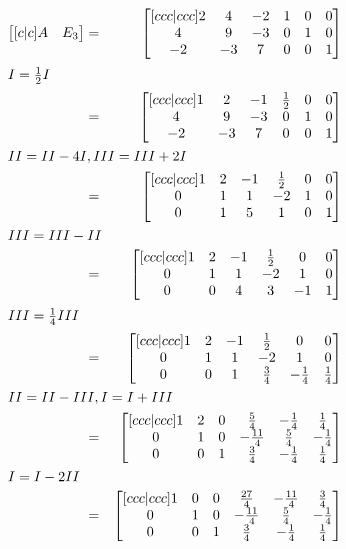 \documentclass[10pt,a4paper,oneside,ngerman,numbers=noenddot]{scrartcl}
\begin{document}
\subsection{} %
\begin{alignat*}{2}
\begin{bmatrix}[c|c]
A & E_{3}
\end{bmatrix} &=& 
\begin{bmatrix}[ccc|ccc]
2 & 4 & -2 & 1 & 0 & 0 \\
4 & 9 & -3 & 0 & 1 & 0 \\
-2 & -3 & 7 & 0 & 0 & 1
\end{bmatrix} \\
\intertext{$I = \frac{1}{2}I$}
&=&
\begin{bmatrix}[ccc|ccc]
1 & 2 & -1 & \frac{1}{2} & 0 & 0 \\
4 & 9 & -3 & 0 & 1 & 0 \\
-2 & -3 & 7 & 0 & 0 & 1
\end{bmatrix} \\
\intertext{$II = II - 4I, III = III + 2I$}
&=&
\begin{bmatrix}[ccc|ccc]
1 & 2 & -1 & \frac{1}{2} & 0 & 0 \\
0 & 1 & 1 & -2 & 1 & 0 \\
0 & 1 & 5 & 1 & 0 & 1
\end{bmatrix} \\
\intertext{$III = III - II$}
&=&
\begin{bmatrix}[ccc|ccc]
1 & 2 & -1 & \frac{1}{2} & 0 & 0 \\
0 & 1 & 1 & -2 & 1 & 0 \\
0 & 0 & 4 & 3 & -1 & 1
\end{bmatrix} \\
\intertext{$III = \frac{1}{4}III$}
&=&
\begin{bmatrix}[ccc|ccc]
1 & 2 & -1 & \frac{1}{2} & 0 & 0 \\
0 & 1 & 1 & -2 & 1 & 0 \\
0 & 0 & 1 & \frac{3}{4} & -\frac{1}{4} & \frac{1}{4}
\end{bmatrix} \\
\intertext{$II = II - III, I = I + III$}
&=&
\begin{bmatrix}[ccc|ccc]
1 & 2 & 0 & \frac{5}{4} & -\frac{1}{4} & \frac{1}{4} \\
0 & 1 & 0 & -\frac{11}{4} & \frac{5}{4} & -\frac{1}{4} \\
0 & 0 & 1 & \frac{3}{4} & -\frac{1}{4} & \frac{1}{4}
\end{bmatrix} \\
\intertext{$I = I - 2II$}
&=&
\begin{bmatrix}[ccc|ccc]
1 & 0 & 0 & \frac{27}{4} & -\frac{11}{4} & \frac{3}{4} \\
0 & 1 & 0 & -\frac{11}{4} & \frac{5}{4} & -\frac{1}{4} \\
0 & 0 & 1 & \frac{3}{4} & -\frac{1}{4} & \frac{1}{4}
\end{bmatrix}
\end{alignat*}
\end{document}
